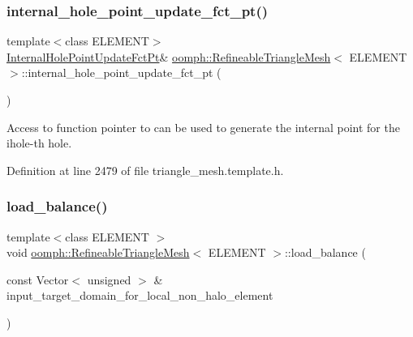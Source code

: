 \subsubsection{\texorpdfstring{internal\+\_\+hole\+\_\+point\+\_\+update\+\_\+fct\+\_\+pt()}{internal\_hole\_point\_update\_fct\_pt()}}
{\footnotesize\ttfamily template$<$class E\+L\+E\+M\+E\+NT$>$ \\
\hyperlink{classoomph_1_1RefineableTriangleMesh_aa6831f42aa1941f4ae0b9186d01f9d7c}{Internal\+Hole\+Point\+Update\+Fct\+Pt}\& \hyperlink{classoomph_1_1RefineableTriangleMesh}{oomph\+::\+Refineable\+Triangle\+Mesh}$<$ E\+L\+E\+M\+E\+NT $>$\+::internal\+\_\+hole\+\_\+point\+\_\+update\+\_\+fct\+\_\+pt (\begin{DoxyParamCaption}{ }\end{DoxyParamCaption})\hspace{0.3cm}{\ttfamily [inline]}}



Access to function pointer to can be used to generate the internal point for the ihole-\/th hole. 



Definition at line 2479 of file triangle\+\_\+mesh.\+template.\+h.

\mbox{\label{classoomph_1_1RefineableTriangleMesh_aaffa40b7d036f8ed8639bf9396f1088a}} 
\subsubsection{\texorpdfstring{load\+\_\+balance()}{load\_balance()}}
{\footnotesize\ttfamily template$<$class E\+L\+E\+M\+E\+NT $>$ \\
void \hyperlink{classoomph_1_1RefineableTriangleMesh}{oomph\+::\+Refineable\+Triangle\+Mesh}$<$ E\+L\+E\+M\+E\+NT $>$\+::load\+\_\+balance (\begin{DoxyParamCaption}\item[{const Vector$<$ unsigned $>$ \&}]{input\+\_\+target\+\_\+domain\+\_\+for\+\_\+local\+\_\+non\+\_\+halo\+\_\+element }\end{DoxyParamCaption})\hspace{0.3cm}{\ttfamily [virtual]}}



